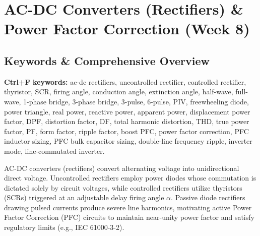 \section{AC-DC Converters (Rectifiers) \& Power Factor Correction (Week 8)}

\subsection{Keywords \& Comprehensive Overview}
\noindent\textbf{Ctrl+F keywords:} ac-dc rectifiers, uncontrolled rectifier, controlled rectifier, thyristor, SCR, firing angle, conduction angle, extinction angle, half-wave, full-wave, 1-phase bridge, 3-phase bridge, 3-pulse, 6-pulse, PIV, freewheeling diode, power triangle, real power, reactive power, apparent power, displacement power factor, DPF, distortion factor, DF, total harmonic distortion, THD, true power factor, PF, form factor, ripple factor, boost PFC, power factor correction, PFC inductor sizing, PFC bulk capacitor sizing, double-line frequency ripple, inverter mode, line-commutated inverter.

\vspace{0.5em}
\noindent AC-DC converters (rectifiers) convert alternating voltage into unidirectional direct voltage. Uncontrolled rectifiers employ power diodes whose commutation is dictated solely by circuit voltages, while controlled rectifiers utilize thyristors (SCRs) triggered at an adjustable delay firing angle $\alpha$. Passive diode rectifiers drawing pulsed currents produce severe line harmonics, motivating active Power Factor Correction (PFC) circuits to maintain near-unity power factor and satisfy regulatory limits (e.g., IEC 61000-3-2).

